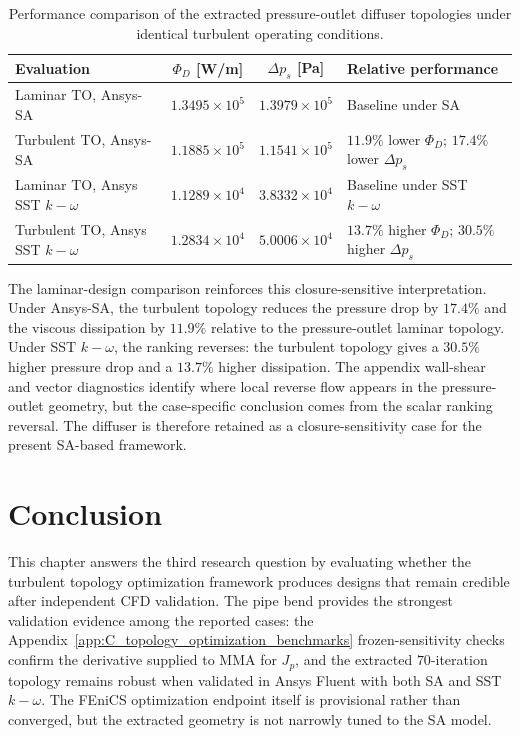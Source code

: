 \begin{table}[!ht]
	\centering
	\footnotesize
	\caption{Performance comparison of the extracted pressure-outlet diffuser topologies under identical turbulent operating conditions.}
	\label{tab:yoon_diffuser_pressure_laminar_perf}
	\renewcommand{\arraystretch}{1.2}
		\begin{tabularx}{\textwidth}{l c c >{\raggedright\arraybackslash}X}
		\hline
		\textbf{Evaluation} & \textbf{$\Phi_D$ [W/m]} & \textbf{$\Delta p_s$ [Pa]} & \textbf{Relative performance} \\
		\hline
		Laminar TO, Ansys-SA & $1.3495\times10^5$ & $1.3979\times10^5$ & Baseline under SA \\
		Turbulent TO, Ansys-SA & $1.1885\times10^5$ & $1.1541\times10^5$ & $11.9\%$ lower $\Phi_D$; $17.4\%$ lower $\Delta p_s$ \\
		Laminar TO, Ansys SST $k-\omega$ & $1.1289\times10^4$ & $3.8332\times10^4$ & Baseline under SST $k-\omega$ \\
		Turbulent TO, Ansys SST $k-\omega$ & $1.2834\times10^4$ & $5.0006\times10^4$ & $13.7\%$ higher $\Phi_D$; $30.5\%$ higher $\Delta p_s$ \\
		\hline
	\end{tabularx}
\end{table}

The laminar-design comparison reinforces this closure-sensitive interpretation. Under Ansys-SA, the turbulent topology reduces the pressure drop by $17.4\%$ and the viscous dissipation by $11.9\%$ relative to the pressure-outlet laminar topology. Under SST $k-\omega$, the ranking reverses: the turbulent topology gives a $30.5\%$ higher pressure drop and a $13.7\%$ higher dissipation. The appendix wall-shear and vector diagnostics identify where local reverse flow appears in the pressure-outlet geometry, but the case-specific conclusion comes from the scalar ranking reversal. The diffuser is therefore retained as a closure-sensitivity case for the present SA-based framework.

\section{Conclusion}
\label{sec:ch6_conclusion}
This chapter answers the third research question by evaluating whether the turbulent topology optimization framework produces designs that remain credible after independent CFD validation. The pipe bend provides the strongest validation evidence among the reported cases: the Appendix~\ref{app:C_topology_optimization_benchmarks} frozen-sensitivity checks confirm the derivative supplied to MMA for $J_p$, and the extracted $70$-iteration topology remains robust when validated in Ansys Fluent with both SA and SST $k-\omega$. The FEniCS optimization endpoint itself is provisional rather than converged, but the extracted geometry is not narrowly tuned to the SA model.

